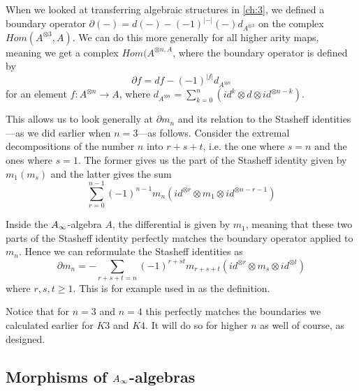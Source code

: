 When we looked at transferring algebraic structures in \ref{ch:3}, we defined a boundary operator $\partial (-) = d(-)-(-1)^{|-|}(-)d_{A^{\otimes 3}}$ on the complex $Hom(A^{\otimes 3}, A)$. We can do this more generally for all higher arity maps, meaning we get a complex $Hom(A^{\otimes n, A}$, where the boundary operator is defined by
\begin{equation*}
    \partial f = df -(-1)^{|f|}d_{A^{\otimes n}}
\end{equation*}
for an element $f\colon A^{\otimes n}\longrightarrow A$, where $d_{A^{\otimes n}}= \sum_{k=0}^{n}(id^{k}\otimes d\otimes id^{\otimes n-k})$. 

This allows us to look generally at $\partial m_n$ and its relation to the Stasheff identities---as we did earlier when $n=3$---as follows. Consider the extremal decompositions of the number $n$ into $r+s+t$, i.e. the one where $s=n$ and the ones where $s=1$. The former gives us the part of the Stasheff identity given by $m_1(m_s)$ and the latter gives the sum 
\begin{equation*}
    \sum_{r=0}^{n-1} (-1)^{n-1}m_n(id^{\otimes r}\otimes m_1\otimes id^{\otimes n-r-1})
\end{equation*}

Inside the $A_{\infty}$-algebra $A$, the differential is given by $m_1$, meaning that these two parts of the Stasheff identity perfectly matches the boundary operator applied to $m_n$. Hence we can reformulate the Stasheff identities as
\begin{equation*}
    \partial m_n = - \sum_{r+s+t=n}(-1)^{r+st}m_{r+s+t}(id^{\otimes r}\otimes m_s\otimes id^{\otimes t})
\end{equation*}
where $r,s,t\geq 1$. This is for example used in \cite{AHO} as the definition. 

Notice that for $n=3$ and $n=4$ this perfectly matches the boundaries we calculated earlier for $K3$ and $K4$. It will do so for higher $n$ as well of course, as designed. 


\subsection{Morphisms of \texorpdfstring{$A_{\infty}$}{A}-algebras}
\label{ssec:A_infinity-morphisms}


